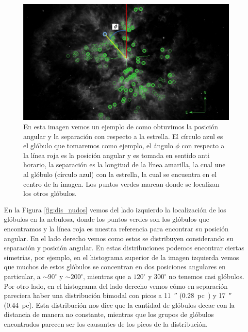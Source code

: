 \documentclass{book}
\begin{document}
\begin{figure}[htb]
    \centering
    \includegraphics[width=\textwidth]{ultimas correcciones/M167_PA.pdf}
    \caption{En esta imagen vemos un ejemplo de como obtuvimos la posición angular y la separación con respecto a la estrella. El círculo azul es el glóbulo que tomaremos como ejemplo, el ángulo $\phi$ con respecto a la línea roja es la posición angular y es tomada en sentido anti horario, la separación es la longitud de la línea amarilla, la cual une al glóbulo (círculo azul) con la estrella, la cual se encuentra en el centro de la imagen. Los puntos verdes marcan donde se localizan los otros glóbulos.}
    \label{fig:ejemplo_PA_Sep}
\end{figure}

En la Figura \ref{fig:dis_nudos} vemos del lado izquierdo la localización de los glóbulos en la nebulosa, donde los puntos verdes son los glóbulos que encontramos y la línea roja es nuestra referencia para encontrar su posición angular. En el lado derecho vemos como estos se distribuyen considerando su separación y posición angular. En estas distribuciones podemos encontrar ciertas simetrías, por ejemplo, en el histograma superior de la imagen izquierda vemos que muchos de estos glóbulos se concentran en dos posiciones angulares en particular, a $\sim90^\circ$ y $\sim200^\circ$, mientras que a $120^\circ$ y $300^\circ$ no tenemos casi glóbulos. Por otro lado, en el histograma del lado derecho vemos cómo en separación pareciera haber una distribución bimodal con picos a \SI{11}{\arcsecond} (\SI{.28}{pc)} y \SI{17}{\arcsecond} (\SI{.44}{pc}). Esta distribución nos dice que la cantidad de glóbulos decae con la distancia de manera no constante, mientras que los grupos de glóbulos encontrados parecen ser los causantes de los picos de la distribución.
\end{document}
